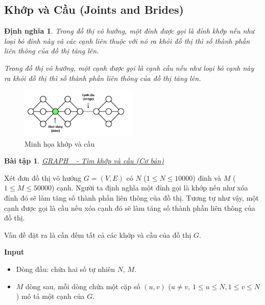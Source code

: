 \documentclass{article}
\newtheorem{dinhnghia}{Định nghĩa}
\newtheorem{baitap}{Bài tập}
\begin{document}
\subsection{Khớp và Cầu (Joints and Brides)}
\begin{dinhnghia}
    
    \item Trong đồ thị vô hướng, một đỉnh được gọi là đỉnh khớp nếu như loại bỏ đỉnh này và các cạnh liên thuộc với nó ra khỏi đồ thị thì số thành phần liên thông của đồ thị tăng lên.
    
    \item Trong đồ thị vô hướng, một cạnh được gọi là cạnh cầu nếu như loại bỏ cạnh này ra khỏi đồ thị thì số thành phần liên thông của đồ thị tăng lên.
\end{dinhnghia}

\begin{figure}[h]
    \centering
    \includegraphics[width=0.5\textwidth]{img/b4/Depth-First-Search-Tree_img4.png}   
    \caption{Minh họa khớp và cầu} 
\end{figure}

\begin{baitap}
    \href{https://oj.vnoi.info/problem/graph_}{GRAPH\_ - Tìm khớp và cầu (Cơ bản)}
\end{baitap}

Xét đơn đồ thị vô hướng $G = (V, E)$ có $N$ ($1 \leq N \leq 10000$) đỉnh và $M$ ($1 \leq M \leq 50000$) cạnh. Người ta định nghĩa một đỉnh gọi là khớp nếu như xóa đỉnh đó sẽ làm tăng số thành phần liên thông của đồ thị. Tương tự như vậy, một cạnh được gọi là cầu nếu xóa cạnh đó sẽ làm tăng số thành phần liên thông của đồ thị.

Vấn đề đặt ra là cần đếm tất cả các khớp và cầu của đồ thị $G$.

\textbf{Input}
\begin{itemize}
    \item Dòng đầu: chứa hai số tự nhiên $N$, $M$.
    \item $M$ dòng sau, mỗi dòng chứa một cặp số $(u, v)$ ($u \neq v$, $1 \leq u \leq N, 1 \leq v \leq N$) mô tả một cạnh của $G$.
\end{itemize}
\end{document}
